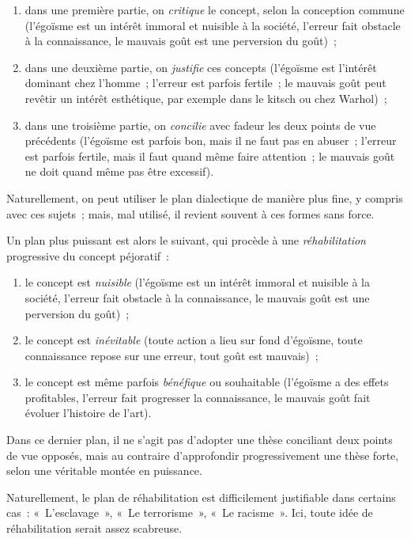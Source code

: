 \documentclass[a4paper]{article}
\begin{document}
\begin{enumerate}
\item dans une première partie, on \emph{critique} le concept, selon la
   conception commune (l'égoïsme est un intérêt immoral et nuisible à la
   société, l'erreur fait obstacle à la connaissance, le mauvais goût
   est une perversion du goût) ;
\item dans une deuxième partie, on \emph{justifie} ces concepts (l'égoïsme est
   l'intérêt dominant chez l'homme ; l'erreur est parfois fertile ; le
   mauvais goût peut revêtir un intérêt esthétique, par exemple dans le
   kitsch ou chez Warhol) ;
\item dans une troisième partie, on \emph{concilie} avec fadeur les deux points
   de vue précédents (l'égoïsme est parfois bon, mais il ne faut pas en
   abuser ; l'erreur est parfois fertile, mais il faut quand même faire
   attention ; le mauvais goût ne doit quand même pas être excessif).
\end{enumerate}

Naturellement, on peut utiliser le plan dialectique de manière plus
fine, y compris avec ces sujets ; mais, mal utilisé, il revient souvent
à ces formes sans force.

Un plan plus puissant est alors le suivant, qui procède à une
\emph{réhabilitation} progressive du concept péjoratif :

\begin{enumerate}
\item le concept est \emph{nuisible} (l'égoïsme est un intérêt immoral et
   nuisible à la société, l'erreur fait obstacle à la connaissance, le
   mauvais goût est une perversion du goût) ;
\item le concept est \emph{inévitable} (toute action a lieu sur fond d'égoïsme,
   toute connaissance repose sur une erreur, tout goût est mauvais) ;
\item le concept est même parfois \emph{bénéfique} ou souhaitable (l'égoïsme a
   des effets profitables, l'erreur fait progresser la connaissance, le
   mauvais goût fait évoluer l'histoire de l'art).
\end{enumerate}

Dans ce dernier plan, il ne s'agit pas d'adopter une thèse conciliant
deux points de vue opposés, mais au contraire d'approfondir
progressivement une thèse forte, selon une véritable montée en
puissance.

Naturellement, le plan de réhabilitation est difficilement justifiable
dans certains cas : « L'esclavage », « Le terrorisme », « Le racisme ». Ici,
toute idée de réhabilitation serait assez scabreuse.
\end{document}
